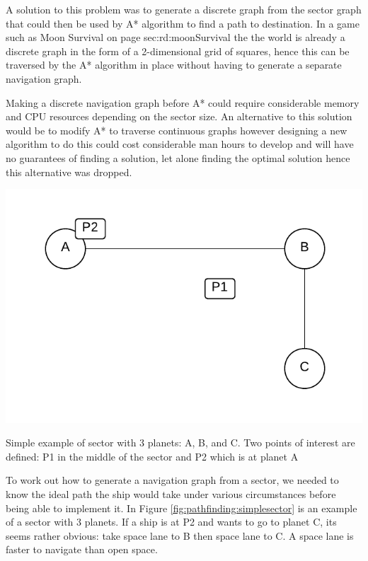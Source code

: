 A solution to this problem was to generate a discrete graph from the sector graph that could then be used by A* algorithm to find a path to destination. 
In a game such as Moon Survival on page {sec:rd:moonSurvival} the the world is already a discrete graph in the form of a 2-dimensional grid of squares, hence this can be traversed by the A* algorithm in place without having to generate a separate navigation graph.

Making a discrete navigation graph before A* could require considerable memory and CPU resources depending on the sector size.
An alternative to this solution would be to modify A* to traverse continuous graphs however designing a new algorithm to do this could cost considerable man hours to develop and will have no guarantees of finding a solution, let alone finding the optimal solution hence this alternative was dropped.

\begin{marginfigure}
	\includegraphics{res/pathfinding/PathFindingSector.pdf}
	\caption[Simple example of sector]{Simple example of sector with 3 planets: A, B, and C. Two points of interest are defined: P1 in the middle of the sector and P2 which is at planet A}
	\label{fig:pathfinding:simplesector}
\end{marginfigure}

To work out how to generate a navigation graph from a sector, we needed to know the ideal path the ship would take under various circumstances before being able to implement it.
In Figure \ref{fig:pathfinding:simplesector} is an example of a sector with 3 planets.
If a ship is at P2 and wants to go to planet C, its seems rather obvious: take space lane to B then space lane to C. A space lane is faster to navigate than open space.

